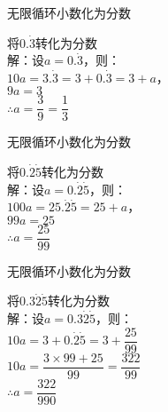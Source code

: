 \documentclass[aspectratio=169]{ctexbeamer} %
\author{致慧星空工作室}
\date{\today}
\begin{document}
\begin{frame}[t]{无限循环小数化为分数}
\begin{spacing}{2} %
\large
将$0.\dot 3$转化为分数\\
解：设$a=0.\dot 3$，则：\\
$10a = 3.\dot3 = 3 + 0.\dot3 = 3 + a$， \\
$9a = 3$ \\
$\therefore a = \dfrac{3}{9} = \dfrac{1}{3}$  \\
\end{spacing}
\end{frame}

\begin{frame}[t]{无限循环小数化为分数}
\begin{spacing}{2} %
\large
将$0.\dot 2 \dot 5$转化为分数\\
解：设$a=0.\dot 2 \dot 5$，则：\\
$100a = 25.\dot 2 \dot 5 = 25 + a$， \\
$99a = 25$ \\
$\therefore a = \dfrac{25}{99}$ \\
\end{spacing}
\end{frame}

\begin{frame}[t]{无限循环小数化为分数}
\begin{spacing}{2} %
\large
将$0.3\dot 2 \dot 5$转化为分数\\
解：设$a = 0.3\dot 2 \dot 5$，则：\\
$10a = 3 + 0.\dot 2 \dot 5 = 3 + \dfrac{25}{99}$ \\
$10a = \dfrac{3 \times 99 + 25}{99} = \dfrac{322}{99}$ \\
$\therefore a = \dfrac{322}{990}$ \\
\end{spacing}
\end{frame}
\end{document}
